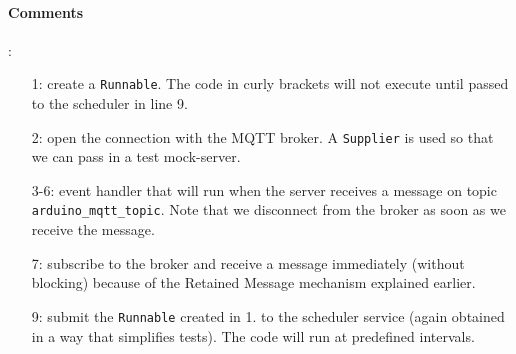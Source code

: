\paragraph*{Comments}:
\begin{enumerate}
    \item [1:] create a \texttt{Runnable}. The code in curly brackets will not execute until passed to the scheduler in line 9.
    \item [2:] open the connection with the MQTT broker. A \texttt{Supplier} is used so that we can pass in a test mock-server.
    \item [3-6:] event handler that will run when the server receives a message on topic \texttt{arduino\_mqtt\_topic}. Note
          that we disconnect from the broker as soon as we receive the message.
    \item [7:] subscribe to the broker and receive a message immediately (without blocking) because of the Retained Message
          mechanism explained earlier.
    \item [9:] submit the \texttt{Runnable} created in 1. to the scheduler service (again obtained in a way that simplifies tests).
          The code will run at predefined intervals.

\end{enumerate}


